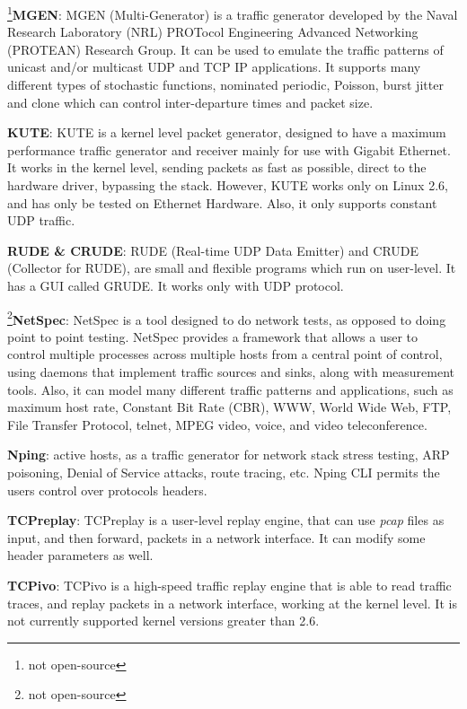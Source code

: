 \footnote{not open-source}\textbf{MGEN}\cite{web-mgen}: MGEN (Multi-Generator) is a traffic generator developed by the Naval Research Laboratory (NRL) PROTocol Engineering Advanced Networking (PROTEAN) Research Group. It can be used to emulate the traffic patterns of unicast and/or multicast UDP and TCP IP applications. It supports many different types of stochastic functions, nominated periodic, Poisson, burst jitter and clone which can control inter-departure times and packet size. 

\textbf{KUTE}\cite{web-kute}: KUTE is a kernel level packet generator, designed to have a maximum performance traffic generator and receiver mainly for use with Gigabit Ethernet. It works in the kernel level, sending packets as fast as possible, direct to the hardware driver, bypassing the stack. However, KUTE works only on Linux 2.6, and has only be tested on Ethernet Hardware. Also, it only supports constant UDP traffic. 


\textbf{RUDE \& CRUDE}\cite{web-rude-crude}: RUDE (Real-time UDP Data Emitter) and CRUDE (Collector for RUDE), are small and flexible programs which run on user-level. It has a GUI called GRUDE. It works only with UDP protocol.

\footnote{not open-source}\textbf{NetSpec}\cite{web-netspec}: NetSpec is a tool designed to do network tests, as opposed to doing point to point testing. NetSpec provides a framework that allows a user to control multiple processes across multiple hosts from a central point of control, using daemons that implement traffic sources and sinks, along with measurement tools. Also, it can model many different traffic patterns and applications, such as maximum host rate, Constant Bit Rate (CBR), WWW, World Wide Web, FTP, File Transfer Protocol, telnet, MPEG video, voice, and video teleconference. 


\textbf{Nping}\cite{web-nping}: active hosts, as a traffic generator for network stack stress testing, ARP poisoning, Denial of Service attacks, route tracing, etc. Nping CLI permits the users control over protocols headers. 

\textbf{TCPreplay}\cite{web-tcpreplay}: TCPreplay is a user-level replay engine, that can use \textit{pcap} files as input, and then forward, packets in a network interface. It can modify some header parameters as well. 


\textbf{TCPivo}\cite{tcpivo-paper}\cite{web-tcpivo}: TCPivo is a high-speed traffic replay engine that is able to read traffic traces, and replay packets in a network interface, working at the kernel level. It is not currently supported kernel versions greater than 2.6. 

